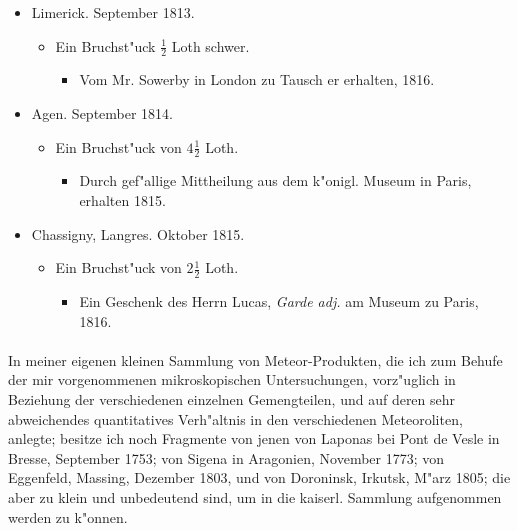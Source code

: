 \documentclass[a4paper, 11pt, oneside, polutonikogreek, german]{article}
\begin{document}
\begin{itemize}
\begin{itemize}
    \end{itemize}
    \item Limerick. September 1813.
    \begin{itemize}
        \item Ein Bruchst"uck $\mathfrak{\frac{1}{2}}$ Loth schwer.
        \begin{itemize}
            \item Vom Mr. Sowerby in London zu Tausch er erhalten, 1816.
        \end{itemize}
    \end{itemize}
    \item Agen. September 1814.
    \begin{itemize}
        \item Ein Bruchst"uck von $\mathfrak{4\frac{1}{2}}$ Loth.
        \begin{itemize}
            \item Durch gef"allige Mittheilung aus dem k"onigl. Museum in Paris, erhalten 1815.
        \end{itemize}
    \end{itemize}
    \item Chassigny, Langres. Oktober 1815.
    \begin{itemize}
        \item Ein Bruchst"uck von $\mathfrak{2\frac{1}{2}}$ Loth.
        \begin{itemize}
            \item Ein Geschenk des Herrn Lucas, \emph{Garde adj.} am Museum zu Paris, 1816.
        \end{itemize}
    \end{itemize}
\end{itemize}
\paragraph{}
In meiner eigenen kleinen Sammlung von Meteor-Produkten, die ich zum Behufe der mir vorgenommenen mikroskopischen Untersuchungen, vorz"uglich in Beziehung der verschiedenen einzelnen Gemengteilen, und auf deren sehr abweichendes quantitatives Verh"altnis in den verschiedenen Meteoroliten, anlegte; besitze ich noch Fragmente von jenen von Laponas bei Pont de Vesle in Bresse, September 1753; von Sigena in Aragonien, November 1773; von Eggenfeld, Massing, Dezember 1803, und von Doroninsk, Irkutsk, M"arz 1805; die aber zu klein und unbedeutend sind, um in die kaiserl. Sammlung aufgenommen werden zu k"onnen.
\end{document}
